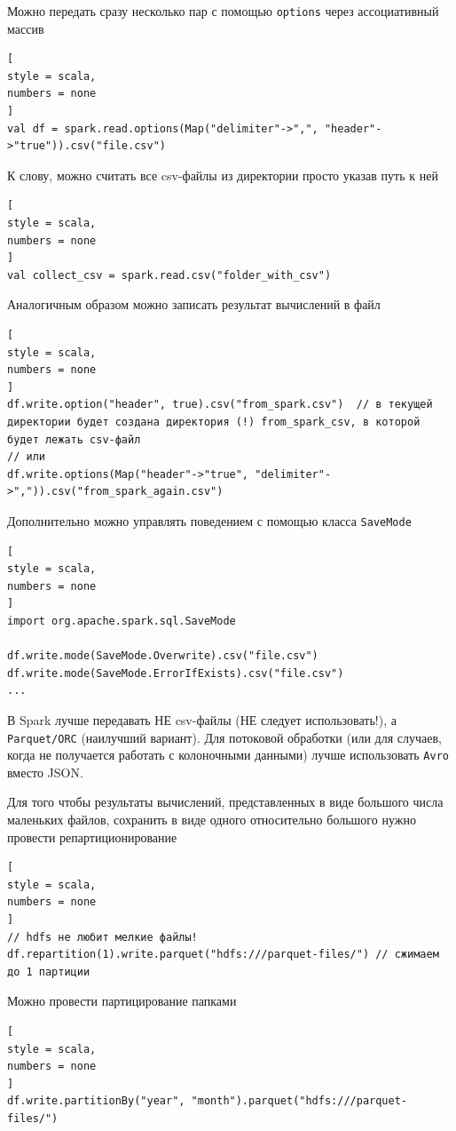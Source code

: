 \documentclass[%
	11pt,
	a4paper,
	utf8,
		]{article}
\begin{document}
Можно передать сразу несколько пар с помощью \texttt{options} через ассоциативный массив
\begin{lstlisting}[
style = scala,
numbers = none
]
val df = spark.read.options(Map("delimiter"->",", "header"->"true")).csv("file.csv")
\end{lstlisting}

К слову, можно считать все csv-файлы из директории просто указав путь к ней
\begin{lstlisting}[
style = scala,
numbers = none	
]
val collect_csv = spark.read.csv("folder_with_csv")
\end{lstlisting}

Аналогичным образом можно записать результат вычислений в файл
\begin{lstlisting}[
style = scala,
numbers = none	
]
df.write.option("header", true).csv("from_spark.csv")  // в текущей директории будет создана директория (!) from_spark_csv, в которой будет лежать csv-файл
// или
df.write.options(Map("header"->"true", "delimiter"->",")).csv("from_spark_again.csv")
\end{lstlisting}

Дополнительно можно управлять поведением с помощью класса \texttt{SaveMode}
\begin{lstlisting}[
style = scala,
numbers = none	
]
import org.apache.spark.sql.SaveMode

df.write.mode(SaveMode.Overwrite).csv("file.csv")
df.write.mode(SaveMode.ErrorIfExists).csv("file.csv")
...
\end{lstlisting}

В Spark лучше передавать НЕ csv-файлы (НЕ следует использовать!), а \texttt{Parquet/ORC} (наилучший вариант). Для потоковой обработки (или для случаев, когда не получается работать с колоночными данными) лучше использовать \texttt{Avro} вместо JSON.

Для того чтобы результаты вычислений, представленных в виде большого числа маленьких файлов, сохранить в виде одного относительно большого нужно провести репартиционирование
\begin{lstlisting}[
style = scala,
numbers = none	
]
// hdfs не любит мелкие файлы!
df.repartition(1).write.parquet("hdfs:///parquet-files/") // сжимаем до 1 партиции
\end{lstlisting}

Можно провести партицирование папками
\begin{lstlisting}[
style = scala,
numbers = none	
]
df.write.partitionBy("year", "month").parquet("hdfs:///parquet-files/")
\end{lstlisting}
\end{document}
